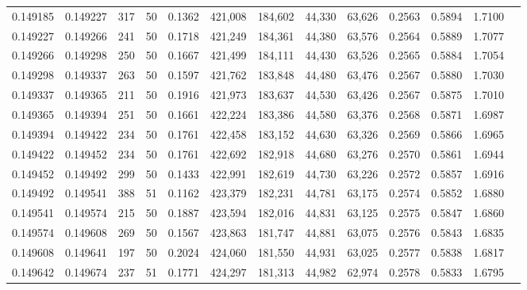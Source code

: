 \begin{tabular}{rrrrrrrrrrrrr}
0.149185 & 0.149227 &   317 &  50 &                                     0.1362 & 421,008 & 184,602 &  44,330 &  63,626 & 0.2563 & 0.5894 & 1.7100 \\
0.149227 & 0.149266 &   241 &  50 &                                     0.1718 & 421,249 & 184,361 &  44,380 &  63,576 & 0.2564 & 0.5889 & 1.7077 \\
0.149266 & 0.149298 &   250 &  50 &                                     0.1667 & 421,499 & 184,111 &  44,430 &  63,526 & 0.2565 & 0.5884 & 1.7054 \\
0.149298 & 0.149337 &   263 &  50 &                                     0.1597 & 421,762 & 183,848 &  44,480 &  63,476 & 0.2567 & 0.5880 & 1.7030 \\
0.149337 & 0.149365 &   211 &  50 &                                     0.1916 & 421,973 & 183,637 &  44,530 &  63,426 & 0.2567 & 0.5875 & 1.7010 \\
0.149365 & 0.149394 &   251 &  50 &                                     0.1661 & 422,224 & 183,386 &  44,580 &  63,376 & 0.2568 & 0.5871 & 1.6987 \\
0.149394 & 0.149422 &   234 &  50 &                                     0.1761 & 422,458 & 183,152 &  44,630 &  63,326 & 0.2569 & 0.5866 & 1.6965 \\
0.149422 & 0.149452 &   234 &  50 &                                     0.1761 & 422,692 & 182,918 &  44,680 &  63,276 & 0.2570 & 0.5861 & 1.6944 \\
0.149452 & 0.149492 &   299 &  50 &                                     0.1433 & 422,991 & 182,619 &  44,730 &  63,226 & 0.2572 & 0.5857 & 1.6916 \\
0.149492 & 0.149541 &   388 &  51 &                                     0.1162 & 423,379 & 182,231 &  44,781 &  63,175 & 0.2574 & 0.5852 & 1.6880 \\
0.149541 & 0.149574 &   215 &  50 &                                     0.1887 & 423,594 & 182,016 &  44,831 &  63,125 & 0.2575 & 0.5847 & 1.6860 \\
0.149574 & 0.149608 &   269 &  50 &                                     0.1567 & 423,863 & 181,747 &  44,881 &  63,075 & 0.2576 & 0.5843 & 1.6835 \\
0.149608 & 0.149641 &   197 &  50 &                                     0.2024 & 424,060 & 181,550 &  44,931 &  63,025 & 0.2577 & 0.5838 & 1.6817 \\
0.149642 & 0.149674 &   237 &  51 &                                     0.1771 & 424,297 & 181,313 &  44,982 &  62,974 & 0.2578 & 0.5833 & 1.6795 \\

\end{tabular}
